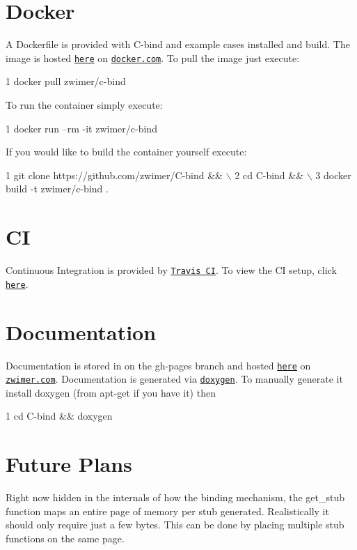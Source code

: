 \section*{Docker}

A {\ttfamily Dockerfile} is provided with {\ttfamily C-\/bind} and example cases installed and build. The image is hosted \href{https://cloud.docker.com/repository/docker/zwimer/c-bind}{\tt here} on \href{https://docker.com}{\tt docker.\+com}. To pull the image just execute\+: 
\begin{DoxyCode}
1 docker pull zwimer/c-bind
\end{DoxyCode}
 To run the container simply execute\+: 
\begin{DoxyCode}
1 docker run --rm -it zwimer/c-bind
\end{DoxyCode}
 If you would like to build the container yourself execute\+: 
\begin{DoxyCode}
1 git clone https://github.com/zwimer/C-bind && \(\backslash\)
2 cd C-bind && \(\backslash\)
3 docker build -t zwimer/c-bind .
\end{DoxyCode}


\section*{CI}

Continuous Integration is provided by \href{https://travis-ci.org}{\tt Travis CI}. To view the CI setup, click \href{https://travis-ci.org/zwimer/C-bind/}{\tt here}.

\section*{Documentation}

Documentation is stored in on the {\ttfamily gh-\/pages} branch and hosted \href{https://zwimer.github.io/C-bind/docs/html/index.html}{\tt here} on \href{https://zwimer.com}{\tt zwimer.\+com}. Documentation is generated via \href{http://www.doxygen.nl/}{\tt doxygen}. To manually generate it install doxygen (from {\ttfamily apt-\/get} if you have it) then 
\begin{DoxyCode}
1 cd C-bind && doxygen
\end{DoxyCode}


\section*{Future Plans}


\begin{DoxyEnumerate}
\item Right now hidden in the internals of how the binding mechanism, the {\ttfamily get\+\_\+stub} function maps an entire page of memory per stub generated. Realistically it should only require just a few bytes. This can be done by placing multiple stub functions on the same page. 
\end{DoxyEnumerate}